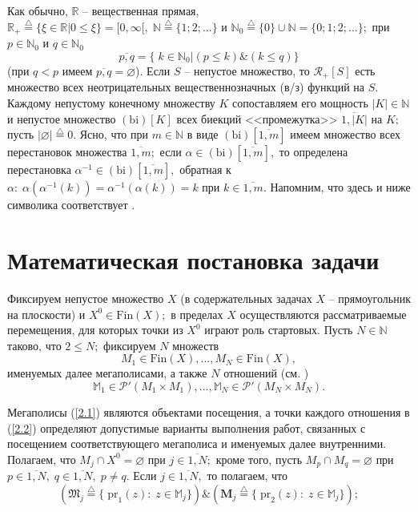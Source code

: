 \documentclass[10pt]{SPIIRAS_Proceedings}
\begin{document}
Как обычно,
$\mathbb{R}$ -- вещественная прямая,
$\mathbb{R}_+ \stackrel{\triangle}{=} \{\xi \in \mathbb{R} \vert 0 \le \xi\} = [0,\infty[,\;\mathbb{N} \stackrel{\triangle}{=} \{1;2;...\}$
и $\mathbb{N}_0 \stackrel{\triangle}{=} \{0\} \cup \mathbb{N} = \{0;1;2;...\};$
при $p \in \mathbb{N}_0$ и $q \in \mathbb{N}_0$
$$
\overline{p,q} = \{\;k \in \mathbb{N}_0 \vert (p \le k) \& (k \le q)\}
$$
(при $q < p$ имеем $\overline{p,q} = \varnothing$).
Если $S$ -- непустое множество, то
$\mathcal{R}_+[S]$
есть множество всех неотрицательных вещественнозначных (в/з) функций на $S.$
Каждому непустому конечному множеству $K$
сопоставляем его мощность $|K| \in \mathbb{N}$
и непустое множество $(\mathrm{bi})[K]$
всех биекций
\cite[c.~87]{17} <<промежутка>>
$\overline{1,|K|}$ на $K;$
пусть
$|\varnothing| \stackrel{\triangle}{=} 0.$
Ясно, что при
$m \in \mathbb{N}$ в виде $(\mathrm{bi})[\overline{1,m}]$
имеем множество всех перестановок
\cite[c.~87]{17} множества
$\overline{1,m};$
если $\alpha \in (\mathrm{bi})[\overline{1,m}],$
то определена перестановка
$\alpha^{-1} \in (\mathrm{bi})[\overline{1,m}],$
обратная к
$\alpha:\;\alpha(\alpha^{-1}(k)) = \alpha^{-1}(\alpha(k)) = k$
при $k \in \overline{1,m}.$
Напомним, что здесь и ниже символика соответствует
\cite[$\S$3.1]{4}.

\section{Математическая постановка задачи}
\label{sec:2}

Фиксируем непустое множество $X$
(в содержательных задачах \cite{4}
$X$ -- прямоугольник на плоскости)
и $X^0 \in \mathrm{Fin}(X);$
в пределах $X$ осуществляются рассматриваемые перемещения,
для которых точки из $X^0$ играют роль стартовых.
Пусть $N \in \mathbb{N}$ таково,
что $2 \le N;$
фиксируем $N$ множеств
\begin{equation}\label{2.1}
M_1 \in \mathrm{Fin}(X),...,M_N \in \mathrm{Fin}(X),
\end{equation}
именуемых далее мегаполисами, а
также $N$ отношений (см. \cite[гл.II,$\S$4]{15})
\begin{equation}\label{2.2}
\mathbb{M}_1 \in \mathcal{P}'(M_1 \times M_1),...,\mathbb{M}_N \in \mathcal{P}'(M_N \times M_N).
\end{equation}

Мегаполисы (\ref{2.1})
являются объектами посещения,
а точки каждого отношения в (\ref{2.2})
определяют допустимые варианты выполнения работ,
связанных с посещением соответствующего мегаполиса и именуемых далее внутренними.
Полагаем, что
$M_j \cap X^0 = \varnothing$
при
$j \in \overline{1,N};$
кроме того, пусть $M_p \cap M_q = \varnothing$
при $p \in \overline{1,N},\;q \in \overline{1,N},\;p \ne q.$
Если $j \in \overline{1,N},$
то полагаем, что
\begin{equation}\label{2.3}
(\mathfrak{M}_j \stackrel{\triangle}{=}
\{\;\mathrm{pr}_1(z):\;z \in \mathbb{M}_j\})
\& (\mathbf{M}_j \stackrel{\triangle}{=}
\{\;\mathrm{pr}_2(z):\;z \in \mathbb{M}_j\});
\end{equation}
\end{document}
